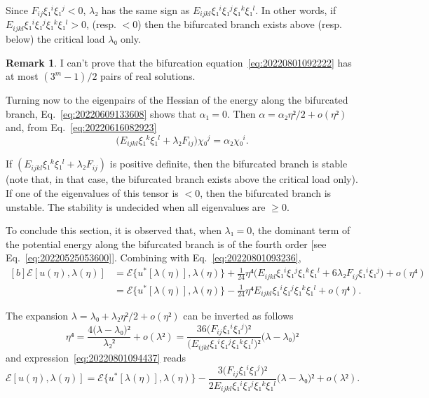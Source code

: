 \documentclass[12pt, final]{scrartcl}
\theoremstyle{definition}
\newtheorem{remark}{Remark}
\begin{document}
Since \(F_{ij} ξ₁^i ξ₁^j < 0\), \(λ₂\) has the same sign as
\(E_{ijkl}ξ₁^i ξ₁^j ξ₁^k ξ₁^l\). In other words, if
\(E_{ijkl}ξ₁^i ξ₁^j ξ₁^k ξ₁^l > 0\), (resp. \(<0\)) then the bifurcated branch
exists above (resp. below) the critical load \(λ₀\) only.

\begin{remark}
  I can't prove that the bifurcation equation~\eqref{eq:20220801092222} has at
  most \((3^m - 1) / 2\) pairs of real solutions.
\end{remark}

Turning now to the eigenpairs of the Hessian of the energy along
the bifurcated branch, Eq.~\eqref{eq:20220609133608} shows that \(α₁ = 0\). Then
\(α = α₂ η² / 2 + o(η²)\) and, from Eq.~\eqref{eq:20220616082923}
\begin{equation}
  \bigl(E_{ijkl} ξ₁^k ξ₁^l + λ₂ F_{ij} \bigr) χ₀^j = α₂ χ₀^i.
\end{equation}

If \((E_{ijkl} ξ₁^k ξ₁^l + λ₂ F_{ij} )\) is positive definite, then the
bifurcated branch is stable (note that, in that case, the bifurcated branch
exists above the critical load only). If one of the eigenvalues of this tensor
is \(<0\), then the bifurcated branch is unstable. The stability is undecided
when all eigenvalues are \(≥ 0\).

To conclude this section, it is observed that, when \(λ₁ = 0\), the dominant
term of the potential energy along the bifurcated branch is of the fourth order
[see Eq.~\eqref{eq:20220525053600}]. Combining with Eq.~\eqref{eq:20220801093236},
\begin{equation}
  \label{eq:20220801094437}
  \begin{aligned}[b]
    ℰ[u(η), λ(η)]
    &= ℰ\{u^{\ast}[λ(η)], λ(η)\} + \tfrac{1}{24} η⁴ \bigl(E_{ijkl} ξ₁^i ξ₁^j ξ₁^k ξ₁^l  + 6  λ₂ F_{ij} ξ₁^i ξ₁^j\bigr) + o(η⁴)\\
    &= ℰ\{u^{\ast}[λ(η)], λ(η)\} - \tfrac{1}{24} η⁴ E_{ijkl} ξ₁^i ξ₁^j ξ₁^k ξ₁^l + o(η⁴).
  \end{aligned}
\end{equation}

The expansion \(λ = λ₀ + λ₂ η² / 2 + o(η²)\) can be inverted as follows
\begin{equation}
  η⁴ = \frac{4 \bigl(λ - λ₀\bigr)²}{λ₂²} + o(λ²) = \frac{36 \bigl( F_{ij} ξ₁^i ξ₁^j \bigr)²}{\bigl( E_{ijkl} ξ₁^i ξ₁^j ξ₁^k ξ₁^l \bigr)²} \bigl( λ - λ₀ \bigr)²
\end{equation}
and expression~\eqref{eq:20220801094437} reads
\begin{equation}
  ℰ[u(η), λ(η)] = ℰ\{u^{\ast}[λ(η)], λ(η)\} - \frac{3 \bigl( F_{ij} ξ₁^i ξ₁^j \bigr)²}{2 E_{ijkl} ξ₁^i ξ₁^j ξ₁^k ξ₁^l } \bigl( λ - λ₀ \bigr)²  + o(λ²).
\end{equation}
\end{document}
